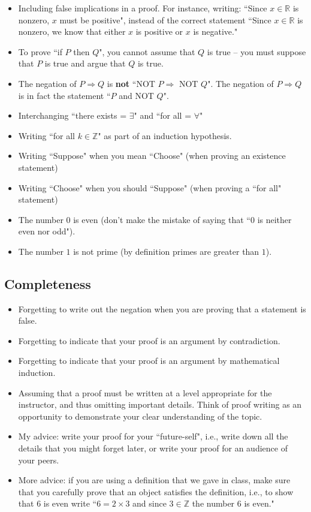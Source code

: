 \documentclass[11pt]{amsart}
\newcommand\R{\mathbb R}    %
\newcommand\Z{\mathbb Z}    %
\begin{document}
\begin{itemize}
	\item Including false implications in a proof.  For instance, writing: ``Since $x\in \R$ is nonzero, $x$ must be positive", instead of the correct statement ``Since $x\in \R$ is nonzero, we know that either $x$ is positive or $x$ is negative." 
	\item To prove ``if $P$ then $Q$", you cannot assume that $Q$ is true -- you must suppose that $P$ is true and argue that $Q$ is true.
	\item The negation of $P \Rightarrow Q$ is \textbf{not} ``NOT $P \Rightarrow$ NOT $Q$".  The negation of $P \Rightarrow Q$ is in fact the statement ``$P$ and NOT $Q$".
	\item Interchanging ``there exists = $\exists$" and ``for all = $\forall$"
	\item Writing ``for all $k\in \Z$" as part of an induction hypothesis.
	\item Writing ``Suppose" when you mean ``Choose" (when proving an existence statement)
	\item Writing ``Choose" when you should ``Suppose" (when proving a ``for all" statement)
	\item The number $0$ is even (don't make the mistake of saying that ``$0$ is neither even nor odd").
	\item The number $1$ is not prime (by definition primes are greater than $1$).
\end{itemize}
	
\subsection*{Completeness}
\begin{itemize}
	\item Forgetting to write out the negation when you are proving that a statement is false.
	\item Forgetting to indicate that your proof is an argument by contradiction.
	\item Forgetting to indicate that your proof is an argument by mathematical induction.
	\item Assuming that a proof must be written at a level appropriate for the instructor, and thus omitting important details.  Think of proof writing as an opportunity to demonstrate your clear understanding of the topic.
	\item My advice: write your proof for your ``future-self", i.e., write down all the details that you might forget later, or write your proof for an audience of your peers.
	\item More advice: if you are using a definition that we gave in class, make sure that you carefully prove that an object satisfies the definition, i.e., to show that $6$ is even write ``$ 6= 2 \times 3$ and since $3 \in \Z$ the number $6$ is even."
\end{itemize}
\end{document}
